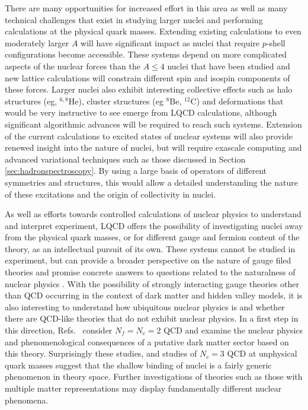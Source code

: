 There are many opportunities for increased effort in this area as well as many technical challenges that exist in studying larger nuclei and performing calculations at the physical quark masses. 
Extending existing calculations to even moderately larger $A$ will have significant impact as nuclei that require $p$-shell configurations become accessible. These systems depend on more complicated aspects of the nuclear forces than the $A\le4$ nuclei that have been studied and new lattice calculations will constrain different spin and isospin components of these forces. Larger nuclei also exhibit interesting collective effects such as halo structures (eg,  ${}^{6,8}$He), cluster structures (eg ${}^{8}$Be, ${}^{12}$C) and deformations that would be very instructive to see emerge from LQCD calculations, although significant algorithmic advances will be required to reach such systems.  Extension of the current calculations to excited states of nuclear systems will also provide renewed insight into the nature of nuclei, but will require exascale computing and advanced variational techniques such as those discussed in Section \ref{sec:hadronspectroscopy}.
By using a large basis of operators of different symmetries and structures, this would allow a detailed understanding the nature of these excitations and the origin of collectivity in nuclei. 

As well as efforts towards controlled calculations of nuclear physics to understand and interpret experiment, LQCD offers the possibility of investigating nuclei away from the physical quark masses, or for different gauge and fermion content of the theory, as an intellectual pursuit of its own. These systems cannot be studied in experiment, but can provide a broader perspective on the nature of gauge filed theories and promise concrete answers to questions related to the naturalness of nuclear physics \cite{Orginos:2015aya,Epelbaum:2012iu,Berengut:2013nh,CarrilloSerrano:2012ja}. With the  possibility of strongly interacting gauge theories other than QCD occurring in the context of dark matter and hidden valley models, it is also interesting to understand how ubiquitous nuclear physics is and whether there are QCD-like theories that do not exhibit nuclear physics.  In a first step in this direction,  Refs.~\cite{Detmold:2014qqa,Detmold:2014kba}  consider $N_f=N_c=2$ QCD and examine the nuclear physics and phenomenological consequences of  a putative dark matter sector based on this theory. Surprisingly these studies, and studies of $N_c=3$ QCD at unphysical quark masses suggest that the shallow binding of nuclei is a fairly generic phenomenon in theory space. Further investigations of theories such as those with multiple matter representations \cite{Ayyar:2017qdf} may display fundamentally different nuclear phenomena.



